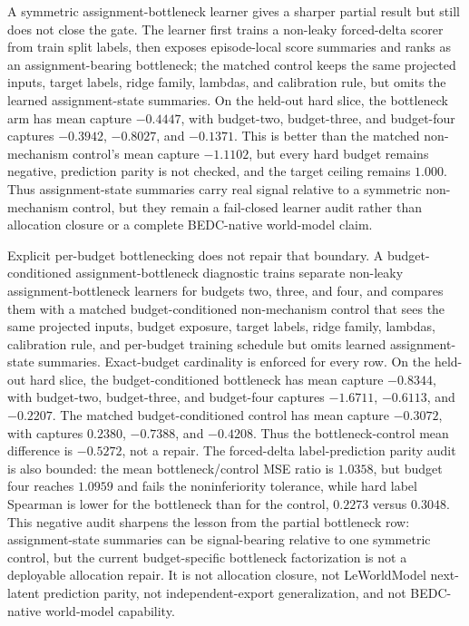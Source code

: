A symmetric assignment-bottleneck learner gives a sharper partial result but
still does not close the gate.  The learner first trains a non-leaky
forced-delta scorer from train split labels, then exposes episode-local score
summaries and ranks as an assignment-bearing bottleneck; the matched control
keeps the same projected inputs, target labels, ridge family, lambdas, and
calibration rule, but omits the learned assignment-state summaries.  On the
held-out hard slice, the bottleneck arm has mean capture $-0.4447$, with
budget-two, budget-three, and budget-four captures $-0.3942$, $-0.8027$, and
$-0.1371$.  This is better than the matched non-mechanism control's mean
capture $-1.1102$, but every hard budget remains negative, prediction parity
is not checked, and the target ceiling remains $1.000$.  Thus assignment-state
summaries carry real signal relative to a symmetric non-mechanism control, but
they remain a fail-closed learner audit rather than allocation closure or a
complete BEDC-native world-model claim.

Explicit per-budget bottlenecking does not repair that boundary.  A
budget-conditioned assignment-bottleneck diagnostic trains separate non-leaky
assignment-bottleneck learners for budgets two, three, and four, and compares
them with a matched budget-conditioned non-mechanism control that sees the same
projected inputs, budget exposure, target labels, ridge family, lambdas,
calibration rule, and per-budget training schedule but omits learned
assignment-state summaries.  Exact-budget cardinality is enforced for every
row.  On the held-out hard slice, the budget-conditioned bottleneck has mean
capture $-0.8344$, with budget-two, budget-three, and budget-four captures
$-1.6711$, $-0.6113$, and $-0.2207$.  The matched budget-conditioned control
has mean capture $-0.3072$, with captures $0.2380$, $-0.7388$, and $-0.4208$.
Thus the bottleneck-control mean difference is $-0.5272$, not a repair.  The
forced-delta label-prediction parity audit is also bounded: the mean
bottleneck/control MSE ratio is $1.0358$, but budget four reaches $1.0959$ and
fails the noninferiority tolerance, while hard label Spearman is lower for the
bottleneck than for the control, $0.2273$ versus $0.3048$.  This negative audit
sharpens the lesson from the partial bottleneck row: assignment-state summaries
can be signal-bearing relative to one symmetric control, but the current
budget-specific bottleneck factorization is not a deployable allocation repair.
It is not allocation closure, not LeWorldModel next-latent prediction parity,
not independent-export generalization, and not BEDC-native world-model
capability.


